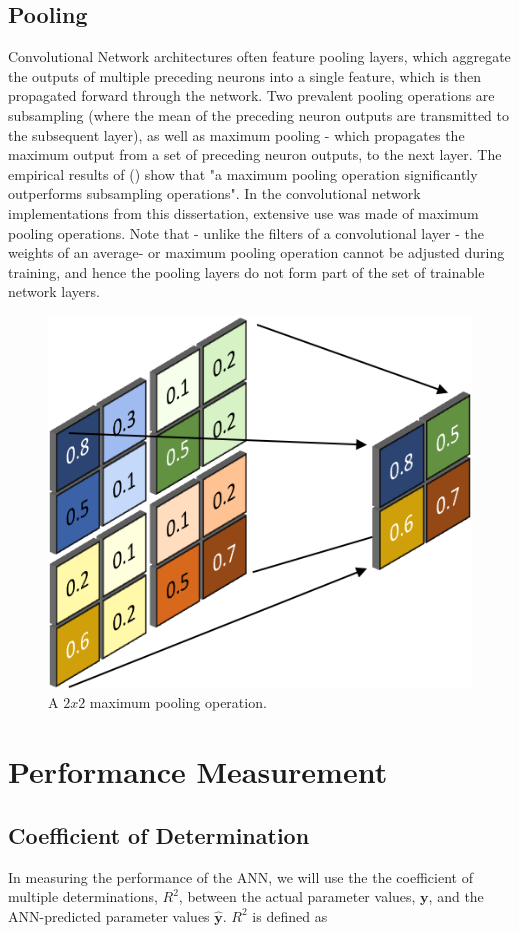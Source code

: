 \documentclass[11pt,oneside,openany,a4paper,english, report, goldenblock
]{usthesis}
\begin{document}
\subsection{Pooling}
Convolutional Network architectures often feature pooling layers, which aggregate the outputs of multiple preceding neurons into a single feature, which is then propagated forward through the network. Two prevalent pooling operations are subsampling (where the mean of the preceding neuron outputs are transmitted to the subsequent layer), as well as maximum pooling - which propagates the maximum output from a set of preceding neuron outputs, to the next layer. The empirical results of  (\citeyear{Scherer2010}) show that "a maximum pooling operation significantly outperforms subsampling operations". In the convolutional network implementations from this dissertation, extensive use was made of maximum pooling operations. Note that - unlike the filters of a convolutional layer - the weights of an average- or maximum pooling operation cannot be adjusted during training, and hence the pooling layers do not form part of the set of trainable network layers.

\begin{figure}[h]
	\centering
	\includegraphics[width=0.4\linewidth]{Images/Diagrams/Max-Pooling_Operation}
	\caption[A $2x2$ maximum pooling operation.]{A $2x2$ maximum pooling operation.}
	\label{fig:max-poolingoperation}
\end{figure}


\section{Performance Measurement}
\subsection{Coefficient of Determination}
In measuring the performance of the ANN, we will use the the coefficient of multiple determinations, $ R^2 $, between the actual parameter values, $ \mathbf{y} $, and the ANN-predicted parameter values $ \mathbf{\hat{y}}$. $ R^2 $ is defined as
\end{document}
